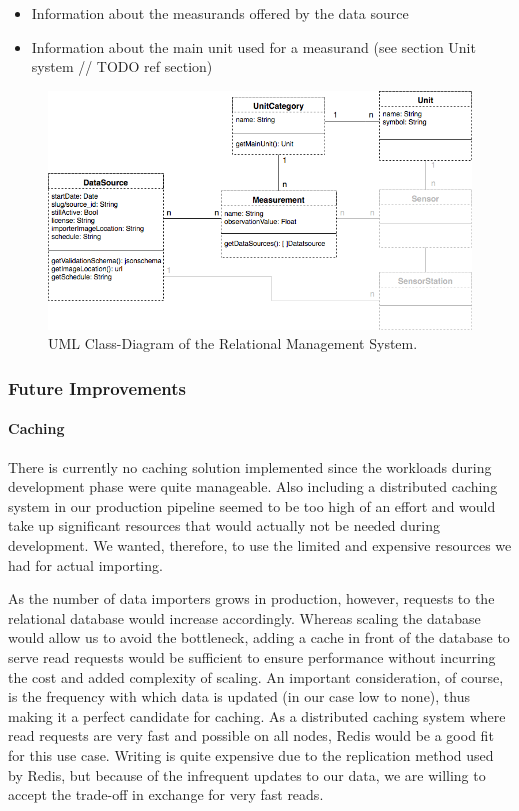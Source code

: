 \begin{itemize}
\tightlist
\item
  Information about the measurands offered by the data source
\item
  Information about the main unit used for a measurand (see section Unit
  system // TODO ref section)
\end{itemize}

\begin{figure}
\centering
\includegraphics{images/relational_schema.png}
\caption{UML Class-Diagram of the Relational Management System.}
\end{figure}

\subsubsection{Future Improvements}\label{future-improvements}

\paragraph{Caching}\label{caching}

There is currently no caching solution implemented since the workloads
during development phase were quite manageable. Also including a
distributed caching system in our production pipeline seemed to be too
high of an effort and would take up significant resources that would
actually not be needed during development. We wanted, therefore, to use
the limited and expensive resources we had for actual importing.

As the number of data importers grows in production, however, requests
to the relational database would increase accordingly. Whereas scaling
the database would allow us to avoid the bottleneck, adding a cache in
front of the database to serve read requests would be sufficient to
ensure performance without incurring the cost and added complexity of
scaling. An important consideration, of course, is the frequency with
which data is updated (in our case low to none), thus making it a
perfect candidate for caching. As a distributed caching system where
read requests are very fast and possible on all nodes, Redis would be a
good fit for this use case. Writing is quite expensive due to the
replication method used by Redis, but because of the infrequent updates
to our data, we are willing to accept the trade-off in exchange for very
fast reads.

